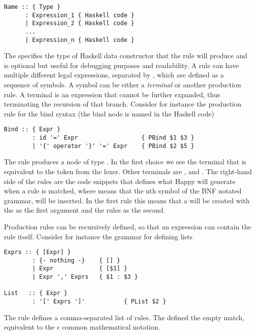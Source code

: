 \begin{lstlisting}
Name :: { Type }
      : Expression_1 { Haskell code }
      | Expression_2 { Haskell code }
      ...
      | Expression_n { Haskell code }
\end{lstlisting}

The  specifies the type of Haskell data constructor that the rule will produce and is optional but useful for debugging purposes and readability. A rule can have multiple different legal expressions, separated by \code{|}, which are defined as a sequence of symbols. A symbol can be either a \emph{terminal} or another production rule. A terminal is an expression that cannot be further expanded, thus terminating the recursion of that branch. Consider for instance the production rule for the bind syntax (the bind node is named  in the Haskell code)

\begin{lstlisting}
Bind :: { Expr }
        : id '=' Expr                  { PBind $1 $3 }
        | '{' operator '}' '=' Expr    { PBind $2 $5 }
\end{lstlisting}

The  rule produces a node of type . In the first choice we see the  terminal that is equivalent to the  token from the lexer. Other terminals are ,  and . The right-hand side of the rules are the code snippets that defines what Happy will generate when a rule is matched, where  means that the nth symbol of the BNF notated grammar, will be inserted. In the first rule this means that a  will be created with the  as the first argument and the  rules as the second.

Production rules can be recursively defined, so that an expression can contain the rule itself. Consider for instance the grammar for defining lists

\begin{lstlisting}
Exprs :: { [Expr] }
        : {- nothing -}    { [] }
        | Expr             { [$1] }
        | Expr ',' Exprs   { $1 : $3 }

List   :: { Expr }
        : '[' Exprs ']'           { PList $2 }
\end{lstlisting}

The  rule defines a comma-separated list of  rules. The  defined the empty match, equivalent to the $\epsilon$ common mathematical notation.

